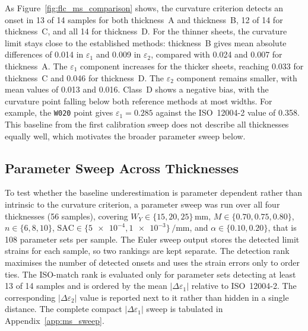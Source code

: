 As Figure~\ref{fig:flc_ms_comparison} shows, the curvature criterion detects an
onset in 13 of 14 samples for both thickness~A and thickness~B, 12 of 14 for thickness~C,
and all 14 for thickness~D. For the thinner sheets, the curvature limit stays close
to the established methods: thickness~B gives mean absolute differences of
\num{0.014} in $\varepsilon_1$ and \num{0.009} in $\varepsilon_2$, compared
with \num{0.024} and \num{0.007} for thickness~A. The $\varepsilon_1$ component
increases for the thicker sheets, reaching \num{0.033} for thickness~C and
\num{0.046} for thickness~D. The $\varepsilon_2$ component remains smaller, with
mean values of \num{0.013} and \num{0.016}. Class~D shows a negative bias, with
the curvature point falling below both reference methods at most widths. For
example, the \texttt{W020} point gives $\varepsilon_1=\num{0.285}$ against the
ISO~12004-2 value of \num{0.358}. This baseline from the first calibration sweep
does not describe all thicknesses equally well, which motivates the broader
parameter sweep below.

\subsection{Parameter Sweep Across Thicknesses}
\label{sec:ms_sweep_thickness}

To test whether the baseline underestimation is parameter dependent rather
than intrinsic to the curvature criterion, a parameter sweep was run over all
four thicknesses (\num{56} samples), covering
$W_Y\in\{15,20,25\}\,\si{\milli\meter}$,
$M\in\{0.70,0.75,0.80\}$, $n\in\{6,8,10\}$,
$\mathrm{SAC}\in\{\num{5e-4},\num{1e-3}\}\,\si{\per\milli\meter}$, and
$\alpha\in\{0.10,0.20\}$, that is \num{108} parameter sets per sample. The Euler
sweep output stores the detected limit strains for each sample, so two rankings
are kept separate. The detection rank maximises the number of detected onsets
and uses the strain errors only to order ties. The ISO-match rank is evaluated
only for parameter sets detecting at least 13 of 14 samples and is ordered by
the mean $|\Delta\varepsilon_1|$ relative to ISO~12004-2. The corresponding
$|\Delta\varepsilon_2|$ value is reported next to it rather than hidden in a
single distance. The complete compact $|\Delta\varepsilon_1|$ sweep is tabulated
in Appendix~\ref{app:ms_sweep}.


